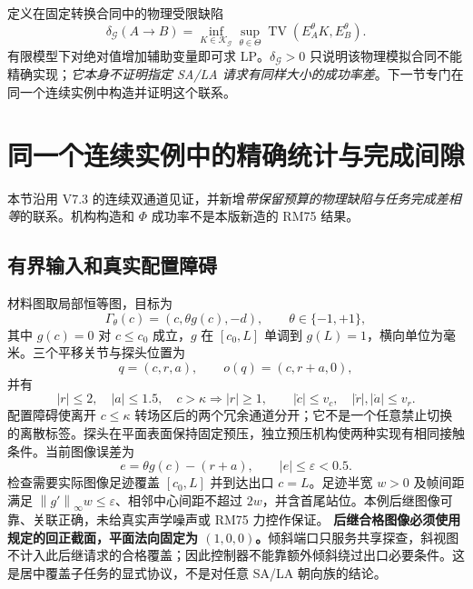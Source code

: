 \documentclass[UTF8,11pt,a4paper,fontset=fandol]{ctexart}
\numberwithin{equation}{section}
\theoremstyle{definition}
\newcommand{\norm}[1]{\left\lVert#1\right\rVert}
\newcommand{\TV}{\operatorname{TV}}
\begin{document}
定义在固定转换合同中的物理受限缺陷
\begin{equation}
\delta_{\mathcal G}(A\!\to\!B)
=\inf_{K\in\mathcal K_{\mathcal G}}
\sup_{\theta\in\Theta}
\TV(E_A^\theta K,E_B^\theta).
\label{eq:physdef}
\end{equation}
有限模型下对绝对值增加辅助变量即可求 LP。$\delta_{\mathcal G}>0$ 只说明该物理模拟合同不能精确实现；\emph{它本身不证明指定 SA/LA 请求有同样大小的成功率差}。下一节专门在同一个连续实例中构造并证明这个联系。

\section{同一个连续实例中的精确统计与完成间隙}
\label{sec:physical}

本节沿用 V7.3 的连续双通道见证，并新增\emph{带保留预算的物理缺陷与任务完成差相等}的联系。机构构造和 $\Phi$ 成功率不是本版新造的 RM75 结果\cite{v73}。

\subsection{有界输入和真实配置障碍}
材料图取局部恒等图，目标为
\begin{equation}
\Gamma_\theta(c)=(c,\theta g(c),-d),\qquad \theta\in\{-1,+1\},
\end{equation}
其中 $g(c)=0$ 对 $c\le c_0$ 成立，$g$ 在 $[c_0,L]$ 单调到 $g(L)=1$，横向单位为毫米。三个平移关节与探头位置为
\begin{equation}
q=(c,r,a),\qquad o(q)=(c,r+a,0),
\end{equation}
并有
\begin{equation}
|r|\le2,\quad |a|\le1.5,\quad
c>\kappa\Longrightarrow |r|\ge1,
\qquad |\dot c|\le v_c,\quad |\dot r|,|\dot a|\le v_r.
\label{eq:geometry}
\end{equation}
配置障碍使离开 $c\le\kappa$ 转场区后的两个冗余通道分开；它不是一个任意禁止切换的离散标签。探头在平面表面保持固定预压，独立预压机构使两种实现有相同接触条件。当前图像误差为
\begin{equation}
e=\theta g(c)-(r+a),\qquad |e|\le\varepsilon<0.5.
\end{equation}
检查需要实际图像足迹覆盖 $[c_0,L]$ 并到达出口 $c=L$。足迹半宽 $w>0$ 及帧间距满足 $\norm{g'}_\infty w\le\varepsilon$、相邻中心间距不超过 $2w$，并含首尾站位。本例后继图像可靠、关联正确，未给真实声学噪声或 RM75 力控作保证。
\textbf{后继合格图像必须使用规定的回正截面，平面法向固定为 $(1,0,0)$。}倾斜端口只服务共享探查，斜视图不计入此后继请求的合格覆盖；因此控制器不能靠额外倾斜绕过出口必要条件。这是居中覆盖子任务的显式协议，不是对任意 SA/LA 朝向族的结论。
\end{document}
